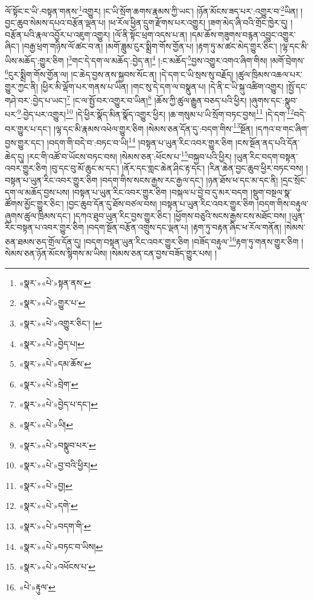 ལོ་སྟོང་ང་ཡི་:བསྟན་གནས་\footnote{«སྣར་»«པེ་»སྟན་ནས་}འགྱུར། །ང་ཡི་སྲོག་ཆགས་རྣམས་ཀྱི་ཡང་། །ཉོན་མོངས་ཟད་པར་:འགྱུར་བ་\footnote{«སྣར་»«པེ་»གྱུར་པ་}ཡིན། །བྱང་ཆུབ་སེམས་དཔའ་བརྩོན་ལྡན་པ། །ཕ་རོལ་ཕྱིན་དྲུག་རྫོགས་པར་འགྱུར། །ཟག་མེད་ཞི་བའི་གྲོང་ཁྱེར་དུ། །བརྩོན་པའི་རྣལ་འབྱོར་པ་འཇུག་འགྱུར། །ལོ་ནི་སྟོང་ཕྲག་འདས་པ་ན། །དམ་ཆོས་གཟུགས་བརྙན་འབྱུང་འགྱུར་ཞིང་། །བརྒྱ་ཕྲག་གཉིས་ལོ་ཚང་བ་ན། །མགོ་ཟླུམ་ངུར་སྨྲིག་གོས་གྱོན་པ། །རྟག་ཏུ་མ་ཚང་མེད་གྱུར་ཅིང་། །ལྷ་དང་མི་ཡིས་མཆོད་:གྱུར་ཅིག །\footnote{«སྣར་»«པེ་»འགྱུར་ཅིང་། །}གང་དེ་དག་ལ་མཆོད་:བྱེད་ན།\footnote{«སྣར་»«པེ་»བྱེད་པ།} །:ང་མཆོད་\footnote{«སྣར་»«པེ་»དམ་ཆོས་}བྱས་འགྱུར་འགའ་ཞིག་གིས། །མགོ་བྲེགས་\footnote{«སྣར་»«པེ་»བྲེག་}ངུར་སྨྲིག་གོས་གྱོན་ལ། །ང་ཆེད་བྱས་ནས་སྐྱབས་སོང་ན། །དེ་དག་ང་ཡི་སྲས་སུ་བརྗོད། །ཚུལ་ཁྲིམས་འཆལ་པར་གྱུར་ཀྱང་ནི། །ཕྱིར་མི་ལྡོག་པར་གནས་པ་ཡིན། །གང་སུ་དེ་དག་ལ་བསྣུན་པ། །དེ་ནི་ང་ཡི་སྐུ་འཚིག་འགྱུར། །སྤྱོ་དང་གཤེ་བར་:བྱེད་པ་ཡང་།\footnote{«སྣར་»«པེ་»བྱེད་པ་དང་།} །ང་ལ་སྤྱོ་བར་འགྱུར་བ་ཡིན།\footnote{«སྣར་»«པེ་»ཡི།} །ཆོས་ཀྱི་ཚུལ་རྒྱུན་བཅད་པའི་ཕྱིར། །ཞུགས་དང་:སྣུབ་པར་\footnote{«སྣར་»«པེ་»བསྣུབ་པར་}:བྱེད་པར་འགྱུར།\footnote{«སྣར་»«པེ་»བྱ་བའི་ཕྱིར།} །དེ་ཕྱིར་སྣོད་མིན་སྣོད་འགྱུར་ཕྱིར། །ཆ་གསུམ་པ་ཡི་སྲོག་བཏང་བྱས།\footnote{«སྣར་»«པེ་»བྱ།} །དེ་དག་\footnote{«སྣར་»«པེ་»དགེ་}བདེ་བར་གྱུར་པ་དང་། །ལྷ་དང་མི་རྣམས་འཕེལ་གྱུར་ཅིག །སེམས་ཅན་དོན་དུ་:བདག་གིས་\footnote{«སྣར་»«པེ་»བདག་གི་}སྔོན། །དཀའ་བ་གང་ཞིག་བྱས་གྱུར་དང་། །བདག་གི་བདེ་བ་:བཏང་བ་ཡི།\footnote{«སྣར་»«པེ་»བཏང་བ་ཡིས།} །བསྟན་པ་ཡུན་རིང་འབར་གྱུར་ཅིག །ངས་སྔོན་ནད་པའི་དོན་ཆེད་དུ། །རང་གི་འཚོ་བ་ཡོངས་བཏང་བས། །སེམས་ཅན་:ཕོངས་པ་\footnote{«སྣར་»«པེ་»འཕོངས་པ་}བསྐྱབ་པའི་ཕྱིར། །ཡུན་རིང་བདག་བསྟན་འབར་གྱུར་ཅིག །བུ་དང་བུ་མོ་ཆུང་མ་དང་། །ནོར་དང་གླང་ཆེན་ཤིང་རྟ་དང་། །རིན་ཆེན་བྱང་ཆུབ་ཕྱིར་བཏང་བས། །བསྟན་པ་ཡུན་རིང་འབར་གྱུར་ཅིག །བདག་གིས་སངས་རྒྱས་རང་རྒྱལ་དང་། །ཉན་ཐོས་ཕ་དང་མ་དང་ནི། །དྲང་སྲོང་དག་ལ་མཆོད་བྱས་པས། །བསྟན་པ་ཡུན་རིང་འབར་གྱུར་ཅིག །བསྐལ་པ་བྱེ་བ་དུ་མར་བདག །སྡུག་བསྔལ་སྣ་ཚོགས་མྱོང་གྱུར་ཅིང་། །བྱང་ཆུབ་དོན་དུ་ཐོས་བཙལ་བས། །བསྟན་པ་ཡུན་རིང་འབར་གྱུར་ཅིག །བདག་གིས་བརྟུལ་ཞུགས་ཚུལ་ཁྲིམས་དང་། །དཀའ་ཐུབ་ཡུན་རིང་བྱས་གྱུར་ཅིང་། །ཕྱོགས་བཅུའི་སངས་རྒྱས་ངས་མཐོང་བས། །ཡུན་རིང་བསྟན་པ་འབར་གྱུར་ཅིག །བདག་སྔོན་བརྩོན་འགྲུས་དང་ལྡན་པ། །རྟག་ཏུ་བརྟན་ཞིང་ཕ་རོལ་གནོན། །སེམས་ཅན་ཐམས་ཅད་གྲོལ་དོན་དུ། །བདག་བསྟན་ཡུན་རིང་འབར་གྱུར་ཅིག །བཟོད་བརྟུལ་\footnote{«པེ་»རྟུལ་}རྟག་ཏུ་གནས་གྱུར་ཅིག །སེམས་ཅན་ཉོན་མོངས་སྙིགས་མ་ཡིས། །སེམས་ཅན་ངན་བྱས་བཟོད་གྱུར་པས། །
